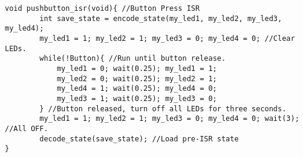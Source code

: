 \documentclass{article}
\begin{document}
\begin{verbatim}
void pushbutton_isr(void){ //Button Press ISR
        int save_state = encode_state(my_led1, my_led2, my_led3, my_led4);
        my_led1 = 1; my_led2 = 1; my_led3 = 0; my_led4 = 0; //Clear LEDs.
        while(!Button){ //Run until button release.
            my_led1 = 0; wait(0.25); my_led1 = 1;
            my_led2 = 0; wait(0.25); my_led2 = 1;
            my_led4 = 1; wait(0.25); my_led4 = 0;
            my_led3 = 1; wait(0.25); my_led3 = 0;
        } //Button released, turn off all LEDs for three seconds.
        my_led1 = 1; my_led2 = 1; my_led3 = 0; my_led4 = 0; wait(3); //All OFF.
        decode_state(save_state); //Load pre-ISR state
}
\end{verbatim}
\end{document}
